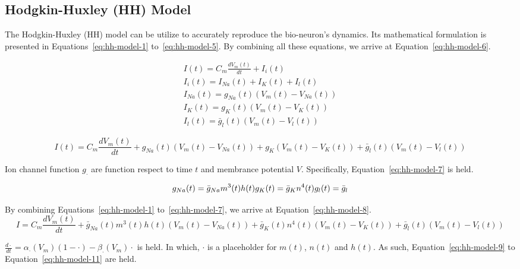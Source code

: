 \subsection{Hodgkin-Huxley (HH) Model}

The Hodgkin-Huxley (HH) model can be utilize to accurately 
reproduce the bio-neuron's dynamics. Its mathematical formulation is presented in
Equations~\ref{eq:hh-model-1} to~\ref{eq:hh-model-5}.
By combining all these equations, we arrive at Equation~\ref{eq:hh-model-6}.

\begin{align}
    I(t) = C_m\frac{dV_m(t)}{dt} + I_{i}(t) \label{eq:hh-model-1} \\
    I_i(t) = I_{Na}(t) + I_K(t) + I_l(t) \label{eq:hh-model-2}  \\
    I_{Na}(t) = g_{Na}(t)(V_m(t) - V_{Na}(t)) \label{eq:hh-model-3} \\
    I_K(t) = g_{K}(t)(V_m(t) - V_{K}(t)) \label{eq:hh-model-4}  \\
    I_l(t) = \bar g_{l}(t)(V_m(t) - V_{l}(t)) \label{eq:hh-model-5} 
\end{align}

\begin{equation}\label{eq:hh-model-6}
    I(t) = C_m\frac{dV_m(t)}{dt} + g_{Na}(t)(V_m(t) - V_{Na}(t)) + g_{K}(V_m(t) - V_{K}(t)) + 
        \bar g_{l}(t)(V_m(t) - V_{l}(t))
\end{equation}

Ion channel function $g_{\cdot}$ are function respect to time $t$ and membrance potential $V$.
Specifically, Equation~\ref{eq:hh-model-7} is held.

\begin{equation}\label{eq:hh-model-7}
    g_{Na}(t) = \bar g_{Na}m^3(t)h(t) \\
    g_{K}(t) = \bar g_{K}n^4(t) \\
    g_{l}(t) = \bar g_l \\
\end{equation}

By combining Equations~\ref{eq:hh-model-1} to~\ref{eq:hh-model-7}, we arrive at Equation~\ref{eq:hh-model-8}.
\begin{equation}\label{eq:hh-model-8}
    I = C_m\frac{dV_m(t)}{dt} + \bar g_{Na}(t)m^3(t)h(t)(V_m(t) - V_{Na}(t)) + 
    \bar g_{K}(t)n^4(t)(V_m(t) - V_{K}(t)) + \bar g_{l}(t)(V_m(t) - V_{l}(t))
\end{equation}

$\frac{d\cdot}{dt}= \alpha_\cdot(V_m)(1-\cdot)-\beta_\cdot(V_m)\cdot $ is held. 
In which, $\cdot$ is a placeholder for $m(t)$, $n(t)$ and $h(t)$. As such, Equation~\ref{eq:hh-model-9} to 
Equation~\ref{eq:hh-model-11} are held.


